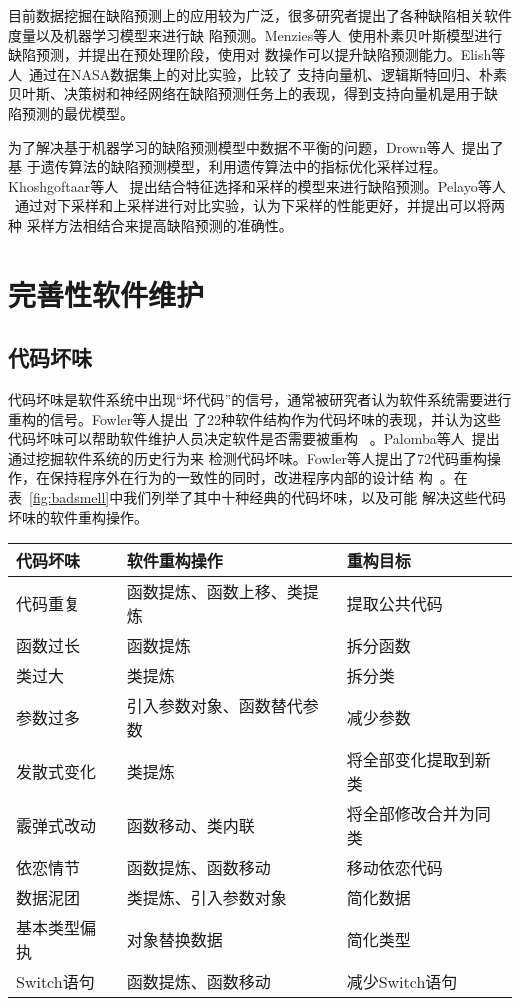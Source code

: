 目前数据挖掘在缺陷预测上的应用较为广泛，很多研究者提出了各种缺陷相关软件度量以及机器学习模型来进行缺
陷预测。Menzies等人~\cite{menzies2007data}使用朴素贝叶斯模型进行缺陷预测，并提出在预处理阶段，使用对
数操作可以提升缺陷预测能力。Elish等人~\cite{elish2008predicting}通过在NASA数据集上的对比实验，比较了
支持向量机、逻辑斯特回归、朴素贝叶斯、决策树和神经网络在缺陷预测任务上的表现，得到支持向量机是用于缺
陷预测的最优模型。

为了解决基于机器学习的缺陷预测模型中数据不平衡的问题，Drown等人~\cite{drown2009evolutionary}提出了基
于遗传算法的缺陷预测模型，利用遗传算法中的指标优化采样过程。Khoshgoftaar等人
~\cite{khoshgoftaar2010attribute}提出结合特征选择和采样的模型来进行缺陷预测。Pelayo等人
~\cite{pelayo2012evaluating}通过对下采样和上采样进行对比实验，认为下采样的性能更好，并提出可以将两种
采样方法相结合来提高缺陷预测的准确性。

\section{完善性软件维护}

\subsection{代码坏味}
代码坏味是软件系统中出现``坏代码''的信号，通常被研究者认为软件系统需要进行重构的信号。Fowler等人提出
了22种软件结构作为代码坏味的表现，并认为这些代码坏味可以帮助软件维护人员决定软件是否需要被重构
~\cite{fowler1999refactoring}。Palomba等人~\cite{palomba2015mining}提出通过挖掘软件系统的历史行为来
检测代码坏味。Fowler等人提出了72代码重构操作，在保持程序外在行为的一致性的同时，改进程序内部的设计结
构~\cite{fowler1999refactoring}。在表~\ref{fig:badsmell}中我们列举了其中十种经典的代码坏味，以及可能
解决这些代码坏味的软件重构操作。

\begin{center}
\zihaowu
{}\label{fig:badsmell}
\begin{tabular}{lll}
\toprule
 代码坏味 & 软件重构操作 & 重构目标\\ \midrule
 代码重复 & 函数提炼、函数上移、类提炼 & 提取公共代码\\ 
 函数过长 & 函数提炼 & 拆分函数\\ 
 类过大 & 类提炼 & 拆分类\\ 
 参数过多 & 引入参数对象、函数替代参数 & 减少参数\\ 
 发散式变化& 类提炼 & 将全部变化提取到新类\\ 
 霰弹式改动& 函数移动、类内联 & 将全部修改合并为同类\\ 
 依恋情节& 函数提炼、函数移动 & 移动依恋代码\\ 
 数据泥团& 类提炼、引入参数对象 & 简化数据\\ 
 基本类型偏执& 对象替换数据 & 简化类型 \\ 
 Switch语句 & 函数提炼、函数移动 & 减少Switch语句\\ 
\bottomrule
\end{tabular}
\end{center}

